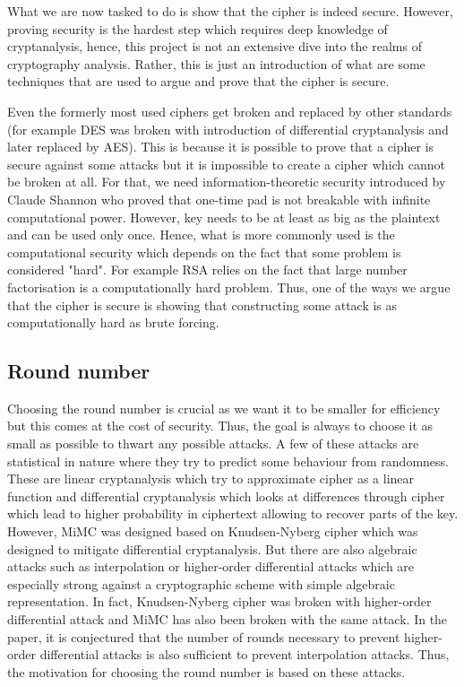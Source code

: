 \documentclass{Resources/UoBLab1}
\theoremstyle{definition}
\begin{document}


What we are now tasked to do is show that the cipher is indeed secure. However, proving security is the hardest step which requires deep knowledge of cryptanalysis, hence, this project is not an extensive dive into the realms of cryptography analysis. Rather, this is just an introduction of what are some techniques that are used to argue and prove that the cipher is secure.

Even the formerly most used ciphers get broken and replaced by other standards (for example DES was broken with introduction of differential cryptanalysis\cite{DESBreak} and later replaced by AES). This is because it is possible to prove that a cipher is secure against some attacks but it is impossible to create a cipher which cannot be broken at all. For that, we need information-theoretic security introduced by Claude Shannon who proved that one-time pad is not breakable with infinite computational power\cite{OneTime}. However, key needs to be at least as big as the plaintext and can be used only once. Hence, what is more commonly used is the computational security which depends on the fact that some problem is considered "hard". For example RSA relies on the fact that large number factorisation is a computationally hard problem. Thus, one of the ways we argue that the cipher is secure is showing that constructing some attack is as computationally hard as brute forcing.

\subsection{Round number}\label{sub:3.1}
Choosing the round number is crucial as we want it to be smaller for efficiency but this comes at the cost of security. Thus, the goal is always to choose it as small as possible to thwart any possible attacks. A few of these attacks are statistical in nature where they try to predict some behaviour from randomness. These are linear\cite{DESLinear} cryptanalysis which try to approximate cipher as a linear function and differential cryptanalysis\cite{DESBreak} which looks at differences through cipher which lead to higher probability in ciphertext allowing to recover parts of the key. However, MiMC was designed based on Knudsen-Nyberg cipher\cite{KNCipher} which was designed to mitigate differential cryptanalysis. But there are also algebraic attacks such as interpolation\cite{InterpolationAttack} or higher-order differential attacks\cite{HigherOrderAttack1}\cite{HigherOrderAttack2} which are especially strong against a cryptographic scheme with simple algebraic representation. In fact, Knudsen-Nyberg cipher was broken with higher-order differential attack\cite{InterpolationAttack} and MiMC has also been broken with the same attack\cite{MiMCAttack}. In the paper, it is conjectured that the number of rounds necessary to prevent higher-order differential attacks is also sufficient to prevent interpolation attacks. Thus, the motivation for choosing the round number is based on these attacks.\medskip
\end{document}
